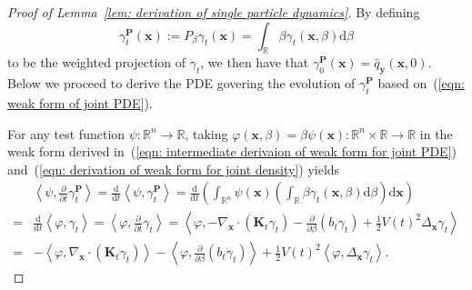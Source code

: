 \documentclass{article}
\numberwithin{equation}{section}
\def\eqref#1{(\ref{#1})}
\newcommand{\dif}{{\mathrm{d}}}
\def\vx{{\bm{x}}}
\def\vy{{\bm{y}}}
\def\mK{{\bm{K}}}
\def\mP{{\bm{P}}}
\begin{document}
\begin{proof}[Proof of Lemma~\ref{lem: derivation of single particle dynamics}]
    
    
    By defining 
    $$\gamma^{\mP}_t(\vx) := P_{\beta}\gamma_t(\vx) = \int_{\mathbb{R}}\beta\gamma_{t}(\vx,\beta)\dif\beta$$
    to be the weighted projection of $\gamma_t$, we then have that $\gamma^{\mP}_0(\vx) = \widehat{q}_{\vy}(\vx,0)$. 
    Below we proceed to derive the PDE govering the evolution of $\gamma^{\mP}_t$ based on~\eqref{eqn: weak form of joint PDE}. 
    
    For any test function $\psi:\mathbb{R}^n \rightarrow \mathbb{R}$, taking $\varphi(\vx,\beta) = \beta\psi(\vx):\mathbb{R}^{n} \times \mathbb{R} \rightarrow \mathbb{R}$ in the weak form derived in~\eqref{eqn: intermediate derivaion of weak form for joint PDE} and~\eqref{eqn: derivation of weak form for joint density} yields
    \begin{equation}
    \label{eqn: intermediate weak form for PDE of projected measure}
    \begin{aligned}
    &\left\langle\psi, \frac{\partial}{\partial t}\gamma^{\mP}_t\right\rangle = \frac{\dif}{\dif t}\left\langle\psi,\gamma^{\mP}_t\right\rangle= \frac{\dif}{\dif t}\left(\int_{\mathbb{R}^n}\psi(\vx)\left(\int_{\mathbb{R}}\beta\gamma_{t}(\vx,\beta)\dif\beta\right)\dif\vx\right) \\
    =& \frac{\dif}{\dif t}\left\langle\varphi,\gamma_t\right\rangle = \left\langle\varphi, \frac{\partial}{\partial t}\gamma_t\right\rangle
    = \left\langle\varphi, -\nabla_{\vx} \cdot \left(\mK_{t}\gamma_t\right) - \frac{\partial}{\partial \beta}\left(b_t \gamma_t\right)+\frac{1}{2}V(t)^2\Delta_{\vx}\gamma_t\right\rangle\\
    =& -\left\langle \varphi, \nabla_{\vx} \cdot \left(\mK_{t}\gamma_t\right) \right\rangle -\left\langle \varphi, \frac{\partial}{\partial \beta}\left(b_t \gamma_t\right) \right\rangle + \frac{1}{2}V(t)^2\left\langle \varphi, \Delta_{\vx}\gamma_t \right\rangle.
    \end{aligned}    
    \end{equation}


\end{proof}
\end{document}

